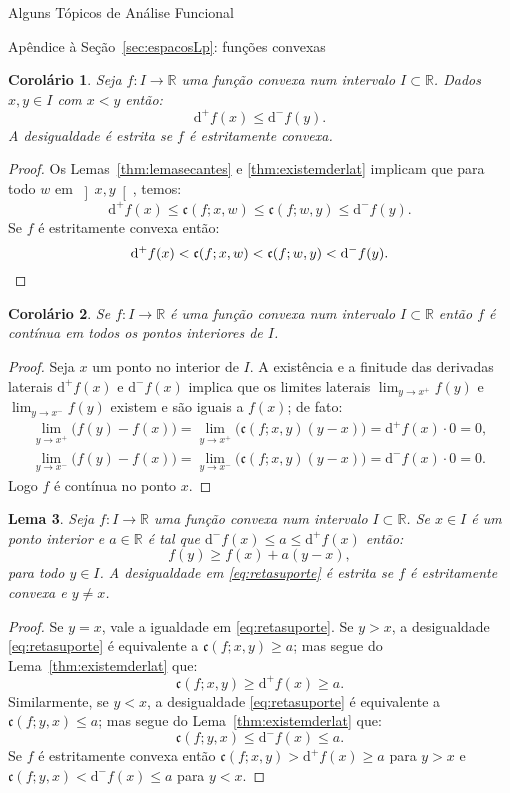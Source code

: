 \documentclass[oneside,final,11pt]{amsbook}
\newcommand{\R}{\mathds R}
\newcommand{\dd}{\mathrm d}
\newcommand{\ca}{\mathfrak c}
\theoremstyle{remark}\newtheorem{exercise}{Exercício}[chapter]
\theoremstyle{remark}\newtheorem{*exercise}[exercise]{\hbox to 0pt{\hskip 0pt minus 1fil*}Exercício}
\theoremstyle{definition}\newtheorem{exdefin}{Definição}[chapter]
\theoremstyle{plain}\newtheorem{teo}{Teorema}[section]
\theoremstyle{plain}\newtheorem{lem}[teo]{Lema}
\theoremstyle{plain}\newtheorem{prop}[teo]{Proposição}
\theoremstyle{plain}\newtheorem{cor}[teo]{Corolário}
\theoremstyle{definition}\newtheorem{defin}[teo]{Definição}
\theoremstyle{remark}\newtheorem{rem}[teo]{Observação}
\theoremstyle{definition}\newtheorem{notation}[teo]{Notação}
\theoremstyle{definition}\newtheorem{convention}[teo]{Convenção}
\theoremstyle{definition}\newtheorem{example}[teo]{Exemplo}
\numberwithin{section}{chapter}
\numberwithin{equation}{section}
\begin{document}
\begin{chapter}{Alguns Tópicos de Análise Funcional}
\begin{section}{Apêndice à Seção~\ref{sec:espacosLp}: funções convexas}
\begin{cor}\label{thm:cordercresc}
Seja $f:I\to\R$ uma função convexa num intervalo $I\subset\R$. Dados $x,y\in I$ com $x<y$ então:
\[\dd^+f(x)\le\dd^-f(y).\]
A desigualdade é estrita se $f$ é estritamente convexa.
\end{cor}
\begin{proof}
Os Lemas~\ref{thm:lemasecantes} e \ref{thm:existemderlat} implicam que para todo $w$ em
$\left]x,y\right[$, temos:
\[\dd^+f(x)\le\ca(f;x,w)\le\ca(f;w,y)\le\dd^-f(y).\]
Se $f$ é estritamente convexa então:
\[\dd^+f(x)<\ca(f;x,w)<\ca(f;w,y)<\dd^-f(y).\qedhere\]
\end{proof}

\begin{cor}
Se $f:I\to\R$ é uma função convexa num intervalo $I\subset\R$ então $f$ é contínua em todos os pontos interiores
de $I$.
\end{cor}
\begin{proof}
Seja $x$ um ponto no interior de $I$. A existência e a finitude
das derivadas laterais $\dd^+f(x)$ e $\dd^-f(x)$ implica que os limites laterais
$\lim_{y\to x^+}f(y)$ e $\lim_{y\to x^-}f(y)$ existem e são iguais a $f(x)$; de fato:
\begin{gather*}
\lim_{y\to x^+}\big(f(y)-f(x)\big)=\lim_{y\to x^+}\big(\ca(f;x,y)(y-x)\big)=\dd^+f(x)\cdot0=0,\\
\lim_{y\to x^-}\big(f(y)-f(x)\big)=\lim_{y\to x^-}\big(\ca(f;x,y)(y-x)\big)=\dd^-f(x)\cdot0=0.
\end{gather*}
Logo $f$ é contínua no ponto $x$.
\end{proof}

\begin{lem}\label{thm:retasuporte}
Seja $f:I\to\R$ uma função convexa num intervalo $I\subset\R$. Se $x\in I$ é um ponto interior e
$a\in\R$ é tal que $\dd^-f(x)\le a\le\dd^+f(x)$ então:
\begin{equation}\label{eq:retasuporte}
f(y)\ge f(x)+a(y-x),
\end{equation}
para todo $y\in I$. A desigualdade em \eqref{eq:retasuporte} é estrita se $f$ é estritamente convexa e $y\ne x$.
\end{lem}
\begin{proof}
Se $y=x$, vale a igualdade em \eqref{eq:retasuporte}. Se $y>x$, a desigualdade \eqref{eq:retasuporte}
é equivalente a $\ca(f;x,y)\ge a$; mas segue do Lema~\ref{thm:existemderlat} que:
\[\ca(f;x,y)\ge\dd^+f(x)\ge a.\]
Similarmente, se $y<x$, a desigualdade \eqref{eq:retasuporte}
é equivalente a $\ca(f;y,x)\le a$; mas segue do Lema~\ref{thm:existemderlat} que:
\[\ca(f;y,x)\le\dd^-f(x)\le a.\]
Se $f$ é estritamente convexa então $\ca(f;x,y)>\dd^+f(x)\ge a$ para $y>x$
e $\ca(f;y,x)<\dd^-f(x)\le a$ para $y<x$.
\end{proof}


\end{section}
\end{chapter}
\end{document}
